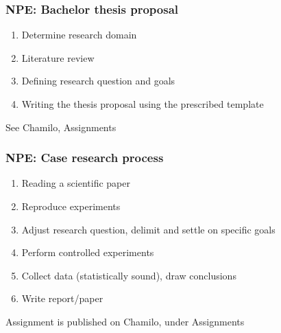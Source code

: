 \documentclass{beamer}
\begin{document}
\begin{frame}
  \frametitle{NPE: Bachelor thesis proposal}

  \begin{enumerate}
    \item Determine research domain
    \item Literature review
    \item Defining research question and goals
    \item Writing the thesis proposal using the prescribed template
  \end{enumerate}

  See Chamilo, Assignments
\end{frame}

\begin{frame}
  \frametitle{NPE: Case research process}


  \begin{enumerate}
    \item Reading a scientific paper
    \item Reproduce experiments
    \item Adjust research question, delimit and settle on specific goals
    \item Perform controlled experiments
    \item Collect data (statistically sound), draw conclusions
    \item Write report/paper
  \end{enumerate}

  Assignment is published on Chamilo, under Assignments
\end{frame}


\end{document}
